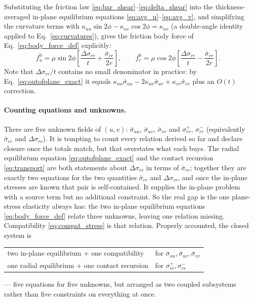 \documentclass[11pt]{article}
\begin{document}
Substituting the friction law \eqref{eq:bar_shear}--\eqref{eq:delta_shear} into
the thickness-averaged in-plane equilibrium equations
\eqref{eq:avg_u}--\eqref{eq:avg_v}, and simplifying the curvature terms with
$\kappa_{uu}\sin 2\phi - \kappa_{uv}\cos 2\phi = \kappa_{uv}$ (a double-angle
identity applied to Eq.~\ref{eq:curvatures}), gives the friction body force of
Eq.~\eqref{eq:body_force_def} explicitly:
\begin{equation}\label{eq:body_force}
    \boxed{\;
    f_u^{\mathrm b} = \mu\sin 2\phi\left[
      \frac{\Delta\sigma_{rr}}{t} + \frac{\bar\sigma_{rr}}{2r}\right],
    \qquad
    f_v^{\mathrm b} = \mu\cos 2\phi\left[
      \frac{\Delta\sigma_{rr}}{t} - \frac{\bar\sigma_{rr}}{2r}\right].\;}
\end{equation}
Note that $\Delta\sigma_{rr}/t$ contains no small denominator in practice: by
Eq.~\eqref{eq:outofplane_exact} it equals
$\kappa_{uu}\bar\sigma_{uu} - 2\kappa_{uv}\bar\sigma_{uv}
+ \kappa_{vv}\bar\sigma_{vv}$ plus an $O(t)$ correction.

\paragraph{Counting equations and unknowns.} There are five unknown fields of
$(u,v)$: $\bar\sigma_{uu}$, $\bar\sigma_{uv}$, $\bar\sigma_{vv}$ and
$\sigma_{rr}^{+}$, $\sigma_{rr}^{-}$ (equivalently $\bar\sigma_{rr}$ and
$\Delta\sigma_{rr}$). It is tempting to count every relation derived so far and
declare closure once the totals match, but that overstates what each buys. The
radial equilibrium equation \eqref{eq:outofplane_exact} and the contact recursion \eqref{eq:transport} are both statements about $\Delta\sigma_{rr}$ in
terms of $\bar\sigma_{rr}$; together they are exactly two equations for the two quantities
$\bar\sigma_{rr}$ and $\Delta\sigma_{rr}$, and once the in-plane stresses are known that
pair is self-contained. It supplies the in-plane problem with a source term but
no additional constraint. So the real gap is the one plane-stress elasticity
always has: the two in-plane equilibrium equations \eqref{eq:body_force_def}
relate three unknowns, leaving one relation missing. Compatibility
\eqref{eq:compat_stress} is that relation. Properly accounted, the closed system
is
\begin{center}
\begin{tabular}{ll}
\toprule
two in-plane equilibrium $+$ one compatibility
  & for $\bar\sigma_{uu}, \bar\sigma_{uv}, \bar\sigma_{vv}$ \\
one radial equilibrium $+$ one contact recursion
  & for $\sigma_{rr}^{+}, \sigma_{rr}^{-}$ \\
\bottomrule
\end{tabular}
\end{center}
--- five equations for five unknowns, but arranged as two coupled subsystems
rather than five constraints on everything at once.
\end{document}
